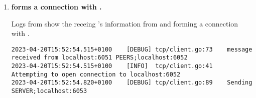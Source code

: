 \begin{enumerate}[itemsep=2.5pt]
  \item \textbf{ forms a connection with .}
  
  Logs from  show the receing 's information from  and forming a connection with .

\begin{lstlisting}[breaklines=true, postbreak=\mbox{\textcolor{red}{$\hookrightarrow$}\space}]
2023-04-20T15:52:54.515+0100	[DEBUG]	tcp/client.go:73	message received from localhost:6051 PEERS;localhost:6052
2023-04-20T15:52:54.515+0100	[INFO]	tcp/client.go:41	Attempting to open connection to localhost:6052
2023-04-20T15:52:54.820+0100	[DEBUG]	tcp/client.go:89	Sending SERVER;localhost:6053
\end{lstlisting}

\end{enumerate}